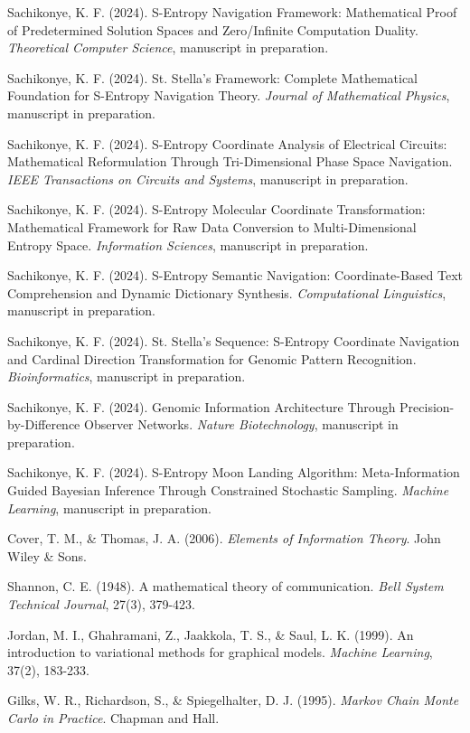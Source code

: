 \documentclass[12pt,a4paper]{article}
\begin{document}

\begin{thebibliography}{99}

Sachikonye, K. F. (2024). S-Entropy Navigation Framework: Mathematical Proof of Predetermined Solution Spaces and Zero/Infinite Computation Duality. \textit{Theoretical Computer Science}, manuscript in preparation.

Sachikonye, K. F. (2024). St. Stella's Framework: Complete Mathematical Foundation for S-Entropy Navigation Theory. \textit{Journal of Mathematical Physics}, manuscript in preparation.

Sachikonye, K. F. (2024). S-Entropy Coordinate Analysis of Electrical Circuits: Mathematical Reformulation Through Tri-Dimensional Phase Space Navigation. \textit{IEEE Transactions on Circuits and Systems}, manuscript in preparation.

Sachikonye, K. F. (2024). S-Entropy Molecular Coordinate Transformation: Mathematical Framework for Raw Data Conversion to Multi-Dimensional Entropy Space. \textit{Information Sciences}, manuscript in preparation.

Sachikonye, K. F. (2024). S-Entropy Semantic Navigation: Coordinate-Based Text Comprehension and Dynamic Dictionary Synthesis. \textit{Computational Linguistics}, manuscript in preparation.

Sachikonye, K. F. (2024). St. Stella's Sequence: S-Entropy Coordinate Navigation and Cardinal Direction Transformation for Genomic Pattern Recognition. \textit{Bioinformatics}, manuscript in preparation.

Sachikonye, K. F. (2024). Genomic Information Architecture Through Precision-by-Difference Observer Networks. \textit{Nature Biotechnology}, manuscript in preparation.

Sachikonye, K. F. (2024). S-Entropy Moon Landing Algorithm: Meta-Information Guided Bayesian Inference Through Constrained Stochastic Sampling. \textit{Machine Learning}, manuscript in preparation.

Cover, T. M., \& Thomas, J. A. (2006). \textit{Elements of Information Theory}. John Wiley \& Sons.

Shannon, C. E. (1948). A mathematical theory of communication. \textit{Bell System Technical Journal}, 27(3), 379-423.

Jordan, M. I., Ghahramani, Z., Jaakkola, T. S., \& Saul, L. K. (1999). An introduction to variational methods for graphical models. \textit{Machine Learning}, 37(2), 183-233.

Gilks, W. R., Richardson, S., \& Spiegelhalter, D. J. (1995). \textit{Markov Chain Monte Carlo in Practice}. Chapman and Hall.

\end{thebibliography}
\end{document}

